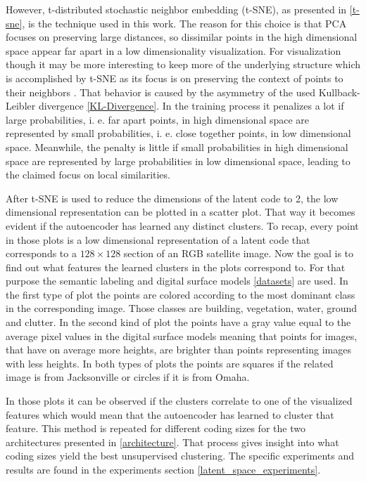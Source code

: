 However,
t-distributed stochastic neighbor embedding (t-SNE), as presented in \ref{t-sne}, is the technique used in this work.
The reason for this choice is that PCA focuses on preserving large distances, so dissimilar points in the
high dimensional space appear far apart in a low dimensionality visualization. For visualization though
it may be more interesting to keep more of the underlying structure which is accomplished by t-SNE as its
focus is on preserving the context of points to their neighbors \parencite{2008-vanDerMaaten-visualizing}.
That behavior is caused by the asymmetry of the used Kullback-Leibler divergence \ref{KL-Divergence}.
In the training process it penalizes a lot if large probabilities, i. e. far apart points, in high dimensional
space are represented by small probabilities, i. e. close together points, in low dimensional space. Meanwhile, the 
penalty is little if small probabilities in high dimensional space are represented by large probabilities in
low dimensional space, leading to the claimed focus on local similarities.

After t-SNE is used to reduce the dimensions of the latent code to 2, the low dimensional representation can be
plotted in a scatter plot. That way it becomes evident if the autoencoder has learned any distinct clusters.
To recap, every point in those plots is a low dimensional representation of a latent code that corresponds to
a $128 \times 128$ section of an RGB satellite image. 
Now the goal is to find out what features the learned clusters in the plots correspond to. For that purpose the
semantic labeling and digital surface models \ref{datasets} are used. In the first type of plot the points
are colored according to the most dominant class in the corresponding image. Those classes are building, vegetation,
water, ground and clutter. In the second kind of plot the points have a gray value equal to the average pixel
values in the digital surface models meaning that points for images, that have on average more heights, are brighter
than points representing images with less heights.
In both types of plots the points are squares if the related image is from Jacksonville or circles if it is from
Omaha.

In those plots it can be observed if the clusters correlate to one of the visualized features which would mean that
the autoencoder has learned to cluster that feature.
This method is repeated for different coding sizes for the two architectures presented in \ref{architecture}.
That process gives insight into what coding sizes yield the best unsupervised clustering. The specific experiments
and results are found in the experiments section \ref{latent_space_experiments}.
